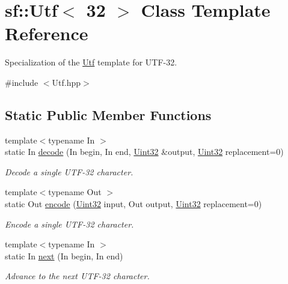 \hypertarget{classsf_1_1_utf_3_0132_01_4}{\section{sf\-:\-:Utf$<$ 32 $>$ Class Template Reference}
\label{classsf_1_1_utf_3_0132_01_4}
}


Specialization of the \hyperlink{classsf_1_1_utf}{Utf} template for U\-T\-F-\/32.  




{\ttfamily \#include $<$Utf.\-hpp$>$}

\subsection*{Static Public Member Functions}
\begin{DoxyCompactItemize}
\item 
{\footnotesize template$<$typename In $>$ }\\static In \hyperlink{classsf_1_1_utf_3_0132_01_4_ad754ce8476f7b80563890dec12cefd46}{decode} (In begin, In end, \hyperlink{namespacesf_aa746fb1ddef4410bddf198ebb27e727c}{Uint32} \&output, \hyperlink{namespacesf_aa746fb1ddef4410bddf198ebb27e727c}{Uint32} replacement=0)
\begin{DoxyCompactList}\small\item\em Decode a single U\-T\-F-\/32 character. \end{DoxyCompactList}\item 
{\footnotesize template$<$typename Out $>$ }\\static Out \hyperlink{classsf_1_1_utf_3_0132_01_4_a27b9d3f3fc49a8c88d91966889fcfca1}{encode} (\hyperlink{namespacesf_aa746fb1ddef4410bddf198ebb27e727c}{Uint32} input, Out output, \hyperlink{namespacesf_aa746fb1ddef4410bddf198ebb27e727c}{Uint32} replacement=0)
\begin{DoxyCompactList}\small\item\em Encode a single U\-T\-F-\/32 character. \end{DoxyCompactList}\item 
{\footnotesize template$<$typename In $>$ }\\static In \hyperlink{classsf_1_1_utf_3_0132_01_4_a788b4ebc728dde2aaba38f3605d4867c}{next} (In begin, In end)
\begin{DoxyCompactList}\small\item\em Advance to the next U\-T\-F-\/32 character. \end{DoxyCompactList}\item 

\end{DoxyCompactItemize}
